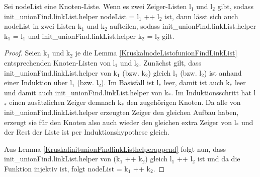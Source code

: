 \begin{lemma}[\KruskalinitunionFindlinkListhelperappendreverse]
  Sei node\-List eine Knoten-Liste.
  Wenn es zwei Zeiger-Listen l$_1$ und l$_2$ gibt, sodass init\_union\-Find.\-linkList.helper nodeList = l$_1$ ++ l$_2$ ist,
  dann lässt sich auch nodeList in zwei Listen k$_1$ und k$_2$ aufteilen, sodass init\_unionFind.linkList.helper k$_1$ = l$_1$
  und init\_u\-ni\-on\-Find.\-linkList.helper k$_2$ = l$_2$ gilt.
\end{lemma}
\begin{proof}
  Seien k$_1$ und k$_2$ je die Lemma \ref{KruskalnodeListofunionFindLinkList} entsprechenden Knoten-Listen von l$_1$ und l$_2$.
  Zunächst gilt, dass init\_unionFind.linkList.helper von k$_1$ (bzw. k$_2$) gleich l$_1$ (bzw. l$_2$) ist anhand einer Induktion über l$_1$ (bzw. l$_2$).
  Im Basisfall ist l$_*$ leer, damit ist auch k$_*$ leer und damit auch init\_unionFind.linkList.helper von k$_*$.
  Im Induktionsschritt hat l$_*$ einen zusätzlichen Zeiger demnach k$_*$ den zugehörigen Knoten.
  Da alle von init\_unionFind.linkList.helper erzeugten Zeiger den gleichen Aufbau haben, erzeugt sie für den Knoten also auch wieder den gleichen extra Zeiger von l$_*$
  und der Rest der Liste ist per Induktionshypothese gleich.
  
  Aus Lemma \ref{KruskalinitunionFindlinkListhelperappend} folgt nun, dass init\_union\-Find.linkList.helper von (k$_1$ ++ k$_2$) gleich l$_1$ ++ l$_2$ ist
  und da die Funktion injektiv ist, folgt nodeList = k$_1$ ++ k$_2$.
\end{proof}





